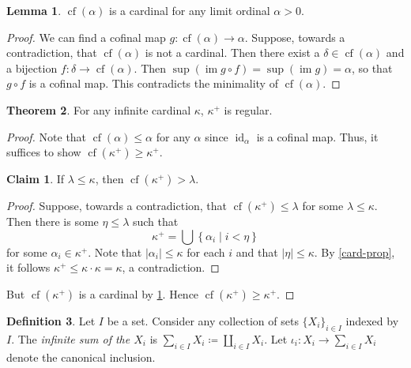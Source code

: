 \documentclass[10pt,letterpaper,cm]{nupset}
\theoremstyle{definition}
\newtheorem{definition}{Definition}[subsection]
\theoremstyle{theorem}
\newtheorem{theorem}[definition]{Theorem}
\newtheorem{lemma}[definition]{Lemma}
\newtheorem*{claim}{Claim}
\theoremstyle{remark}
\newcommand{\1}{\mathbf{1}}
\newcommand{\0}{\vec 0}
\DeclareMathOperator{\id}{id}
\DeclareMathOperator{\im}{im}
\DeclareMathOperator{\cf}{cf}
\begin{document}
\begin{lemma}\label{PL'}
$\cf(\alpha)$ is a cardinal for any limit ordinal $\alpha >0$.
\end{lemma}
\begin{proof}
We can find a cofinal map $g: \cf(\alpha) \to \alpha$. Suppose, towards a contradiction, that $\cf(\alpha)$  is not a cardinal. Then there exist a $\delta \in \cf(\alpha)$  and a bijection $f: \delta \to \cf(\alpha)$. Then $\sup(\im{g\circ f}) = \sup(\im{g}) = \alpha $, so that $g \circ f$ is a cofinal map. This contradicts the minimality of $\cf(\alpha)$. 
\end{proof}

\begin{theorem}
For any infinite cardinal $\kappa$, $\kappa^+$ is regular. 
\end{theorem}
\begin{proof}
Note that $\cf(\alpha)\leq \alpha$ for any $\alpha$ since $\id_{\alpha}$ is a cofinal map. Thus, it suffices to show $\cf(\kappa^+) \geq \kappa^+$. 
\begin{claim}
If $\lambda \leq \kappa$, then $\cf(\kappa^+) > \lambda$. 
\end{claim}
\begin{proof}
Suppose, towards a contradiction, that $\cf(\kappa^+) \leq \lambda$ for some $\lambda \leq \kappa$. Then there is some $\eta \leq \lambda$ such that $$\kappa^+ = \bigcup{\left\{\alpha_i \mid i <\eta \right\}}$$ for some $\alpha_i \in \kappa^+$. Note that $\lvert{\alpha_i}\rvert \leq \kappa$ for each $i$ and that $\lvert{\eta}\rvert \leq \kappa$. By \cref{card-prop}, it follows $\kappa^+ \leq \kappa \cdot \kappa = \kappa$, a contradiction.  
\end{proof}But $\cf(\kappa^+)$ is a cardinal  by \cref{PL'}. Hence $\cf(\kappa^+) \geq \kappa^+$.
\end{proof}


\begin{definition} Let $I$ be a set. Consider any collection of sets $\{X_i\}_{i\in I}$ indexed by $I$.
The \textit{infinite sum of the $X_i$} is $\sum_{i\in I} X_i \coloneqq \coprod_{i\in I} X_i$. Let $\iota_i : X_i \to \sum_{i\in I} X_i $ denote the canonical inclusion. 
\end{definition}
\end{document}

